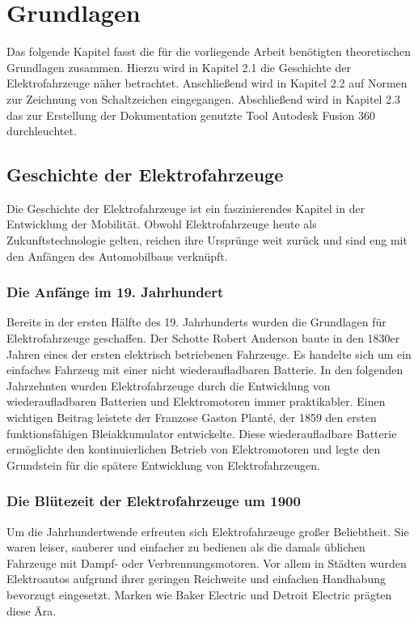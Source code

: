 \chapter{Grundlagen}
\label{cha:Grundlagen}

Das folgende Kapitel fasst die für die vorliegende Arbeit benötigten theoretischen Grundlagen zusammen. Hierzu wird in Kapitel 2.1 die Geschichte der Elektrofahrzeuge näher betrachtet. Anschließend wird in Kapitel 2.2 auf Normen zur Zeichnung von Schaltzeichen eingegangen. Abschließend wird in Kapitel 2.3 das zur Erstellung der Dokumentation genutzte Tool Autodesk Fusion 360 durchleuchtet.
\section{Geschichte der Elektrofahrzeuge}

Die Geschichte der Elektrofahrzeuge ist ein faszinierendes Kapitel in der Entwicklung der Mobilität. Obwohl Elektrofahrzeuge heute als Zukunftstechnologie gelten, reichen ihre Ursprünge weit zurück und sind eng mit den Anfängen des Automobilbaus verknüpft.

\subsection*{Die Anfänge im 19. Jahrhundert}

Bereits in der ersten Hälfte des 19. Jahrhunderts wurden die Grundlagen für Elektrofahrzeuge geschaffen. Der Schotte Robert Anderson baute in den 1830er Jahren eines der ersten elektrisch betriebenen Fahrzeuge. Es handelte sich um ein einfaches Fahrzeug mit einer nicht wiederaufladbaren Batterie. In den folgenden Jahrzehnten wurden Elektrofahrzeuge durch die Entwicklung von wiederaufladbaren Batterien und Elektromotoren immer praktikabler.\autocite{vattenfall_elektroauto_geschichte} 
Einen wichtigen Beitrag leistete der Franzose Gaston Planté, der 1859 den ersten funktionsfähigen Bleiakkumulator entwickelte. Diese wiederaufladbare Batterie ermöglichte den kontinuierlichen Betrieb von Elektromotoren und legte den Grundstein für die spätere Entwicklung von Elektrofahrzeugen. \autocite{cosmos_gaston_plante}

\subsection*{Die Blütezeit der Elektrofahrzeuge um 1900}

Um die Jahrhundertwende erfreuten sich Elektrofahrzeuge großer Beliebtheit. Sie waren leiser, sauberer und einfacher zu bedienen als die damals üblichen Fahrzeuge mit Dampf- oder Verbrennungsmotoren. Vor allem in Städten wurden Elektroautos aufgrund ihrer geringen Reichweite und einfachen Handhabung bevorzugt eingesetzt. \autocite{energyprofi_elektromobile_geschichte} Marken wie Baker Electric und Detroit Electric prägten diese Ära. \autocite{einfacheauto_elektroauto_geschichte}

